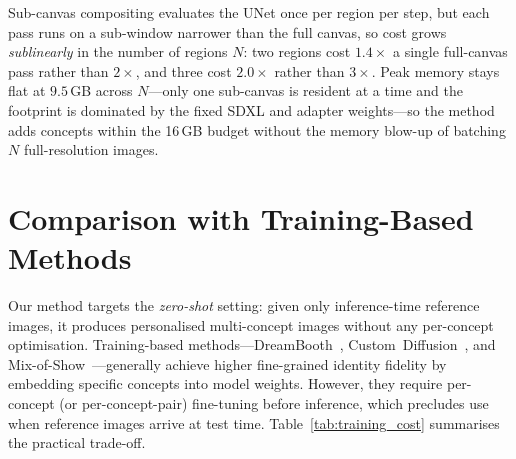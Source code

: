 \documentclass[review,10pt,times]{elsarticle}
\begin{document}
\begin{table}[htbp]
\centering
\caption{Inference cost (RTX\,5080\,16\,GB, $768\!\times\!768$, 30
         DPM-Solver++ steps, seed 42; \texttt{time.perf\_counter}, 5
         timed runs after 2 warm-ups, identical inline sampler, no CPU
         offload, VAE decode excluded).}
\label{tab:timing}
\end{table}

Sub-canvas compositing evaluates the UNet once per region per step, but
each pass runs on a sub-window narrower than the full canvas, so cost
grows \emph{sublinearly} in the number of regions $N$: two regions cost
$1.4\times$ a single full-canvas pass rather than $2\times$, and three
cost $2.0\times$ rather than $3\times$.  Peak memory stays flat at
$9.5$\,GB across $N$---only one sub-canvas is resident at a time and the
footprint is dominated by the fixed SDXL and adapter weights---so the
method adds concepts within the 16\,GB budget without the memory
blow-up of batching $N$ full-resolution images.


\section{Comparison with Training-Based Methods}
\label{sec:training_compare}

Our method targets the \emph{zero-shot} setting: given only inference-time
reference images, it produces personalised multi-concept images without
any per-concept optimisation.
Training-based methods—DreamBooth~\cite{ruiz2023dreambooth},
Custom~Diffusion~\cite{kumari2023multi}, and
Mix-of-Show~\cite{gu2023mix}—generally achieve higher fine-grained
identity fidelity by embedding specific concepts into model weights.
However, they require per-concept (or per-concept-pair) fine-tuning
before inference, which precludes use when reference images arrive at
test time.
Table~\ref{tab:training_cost} summarises the practical trade-off.
\end{document}
